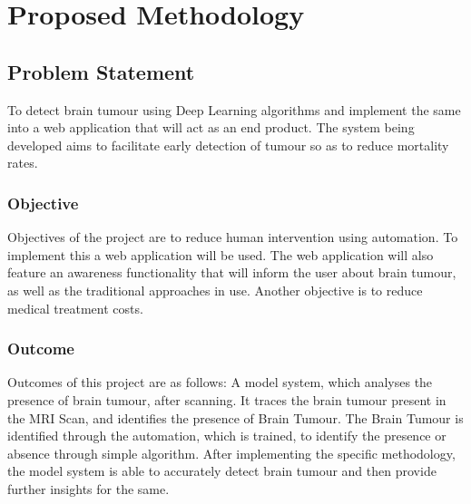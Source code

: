 \chapter{Proposed Methodology}
\section{Problem Statement}
To detect brain tumour using Deep Learning algorithms and implement the same into a web application that will act as an end product. The system being developed aims to facilitate early detection of tumour so as to reduce mortality rates. 
\subsection{Objective}
Objectives of the project are to reduce human intervention using automation. To implement this a web application will be used. The web application will also feature an awareness functionality that will inform the user about brain tumour, as well as the traditional approaches in use. Another objective is to reduce medical treatment costs.

\subsection{Outcome}
Outcomes of this project are as follows:
A model system, which analyses the presence of brain tumour, after scanning. It traces the brain tumour present in the MRI Scan, and identifies the presence of Brain Tumour. The Brain Tumour is identified through the automation, which is trained, to identify the presence or absence through simple algorithm. After implementing the specific methodology, the model system is able to accurately detect brain tumour and then provide further insights for the same.

